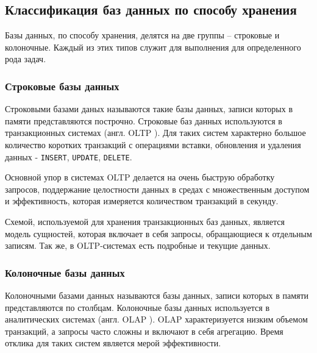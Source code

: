 %
%

\subsection{Классификация баз данных по способу хранения}

Базы данных, по способу хранения, делятся на две группы -- строковые и колоночные. Каждый из этих типов служит для выполнения для определенного рода задач.

\subsubsection{Строковые базы данных}

Строковыми базами даных называются такие базы данных, записи которых в памяти представляются построчно.
Строковые баз данных используются в транзакционных системах (англ. OLTP \cite{OLTP}). Для таких систем характерно большое количество коротких транзакций с операциями вставки, обновления и удаления данных - \texttt{INSERT}, \texttt{UPDATE}, \texttt{DELETE}.

Основной упор в системах OLTP делается на очень быструю обработку запросов, поддержание целостности данных в средах с множественным доступом и эффективность, которая измеряется количеством транзакций в секунду.

Схемой, используемой для хранения транзакционных баз данных, является модель сущностей, которая включает в себя запросы, обращающиеся к отдельным записям. Так же, в OLTP-системах есть подробные и текущие данных.\\

\subsubsection{Колоночные базы данных}

Колоночными базами данных называются базы данных, записи которых в памяти представляются по столбцам. Колоночные базы данных используется в аналитических системах (англ. OLAP \cite{OLAP}). OLAP характеризуется низким объемом транзакций, а запросы часто сложны и включают в себя агрегацию. Время отклика для таких систем является мерой эффективности.

